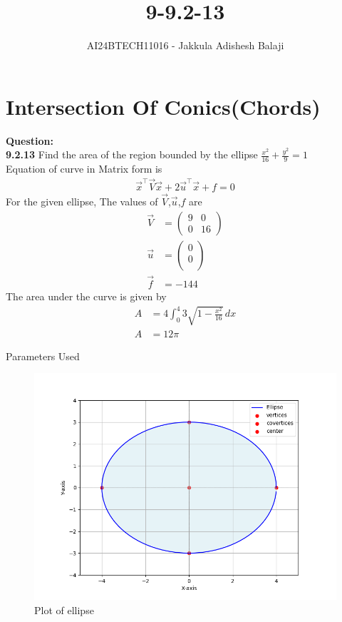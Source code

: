 \documentclass[journal]{IEEEtran}
\begin{document}

\setlength{\intextsep}{10pt} %

\title{9-9.2-13}
\author{AI24BTECH11016 - Jakkula Adishesh Balaji}
\maketitle
\section*{\textbf{Intersection Of Conics(Chords)}}
\parindent 0pt
\textbf{Question:} \\
\textbf{9.2.13} Find the area of the region bounded by the ellipse $\frac{x^{2}}{16} + \frac{y^{2}}{9} = 1$\\
\solution
Equation of curve in Matrix form is \\
\begin{align}
\vec{x}^\top\vec{V}\vec{x} + 2\vec{u}^\top\vec{x} + f = 0
\end{align}
For the given ellipse, The values of $\vec{V}$,$\vec{u}$,$f$ are
\begin{align}
\vec{V}&=\begin{pmatrix}9 & 0\\0 & 16\end{pmatrix}\\
\vec{u}&=\begin{pmatrix}0\\0\\\end{pmatrix} \\
\vec{f}&=-144
\end{align}
The area under the curve is given by \\
\begin{align}
A &= 4 \int_0^4 3 \sqrt{1 - \frac{x^2}{16}} \, dx \\
A &= 12\pi 
\end{align}
\begin{table}[h!]    	
    \centering
     
    \caption{Parameters Used}
    \label{tab:1-1.9-6}
\end{table}
\begin{figure}[h!]
    \centering
    \includegraphics[width = 1\linewidth]{figs/Figure_1.png}
    \caption{Plot of ellipse}
    \label{fig:stemplot}
\end{figure}
\end{document}
